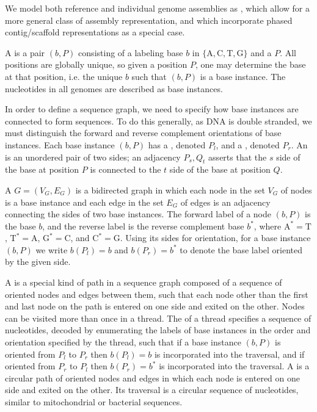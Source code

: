 \documentclass[11pt,proposal]{ucthesis}
\begin{document}


We model both reference and individual genome assemblies as , which allow for a more general class of assembly representation, and which incorporate phased contig/scaffold representations as a special case. 

A  is a pair $(b,P)$ consisting of a labeling base $b$ in $\{\mathrm{A},\mathrm{C},\mathrm{T},\mathrm{G}\}$ and a  $P$. All positions are globally unique, so given a position $P$, one may determine the base at that position, i.e. the unique $b$ such that $(b,P)$ is a base instance. The nucleotides in all genomes are described as base instances. 

In order to define a sequence graph, we need to specify how base instances are connected to form sequences. To do this generally, as DNA is double stranded, we must distinguish the forward and reverse complement orientations of base instances. Each base instance $(b,P)$ has a , denoted $P_l$, and a , denoted $P_r$. An  is an unordered pair of two sides; an adjacency ${P_s, Q_t}$ asserts that the $s$ side of the base at position $P$ is connected to the $t$ side of the base at position $Q$. 

A  $G = (V_G,E_G)$ is a bidirected graph \cite{medvedev2009maximum} in which each node in the set $V_G$ of nodes is a base instance and each edge in the set $E_G$ of edges is an adjacency connecting the sides of two base instances. The forward label of a node $(b,P)$ is the base $b$, and the reverse label is the reverse complement base $b^*$, where $\mathrm{A}^* = \mathrm{T}$, $\mathrm{T}^* = \mathrm{A}$, $\mathrm{G}^* = \mathrm{C}$, and $\mathrm{C}^* = \mathrm{G}$. Using its sides for orientation, for a base instance $(b, P)$ we write $b(P_l) = b$ and $b(P_r) = b^*$ to denote the base label oriented by the given side.

A  is a special kind of path in a sequence graph composed of a sequence of oriented nodes and edges between them, such that each node other than the first and last node on the path is entered on one side and exited on the other. Nodes can be visited more than once in a thread. The  of a thread specifies a sequence of nucleotides, decoded by enumerating the labels of base instances in the order and orientation specified by the thread, such that if a base instance $(b, P)$ is oriented from $P_l$ to $P_r$ then $b(P_l) = b$ is incorporated into the traversal, and if oriented from $P_r$ to $P_l$ then $b(P_r) = b^*$ is incorporated into the traversal. A  is a circular path of oriented nodes and edges in which each node is entered on one side and exited on the other. Its traversal is a circular sequence of nucleotides, similar to mitochondrial or bacterial sequences.  
\end{document}

